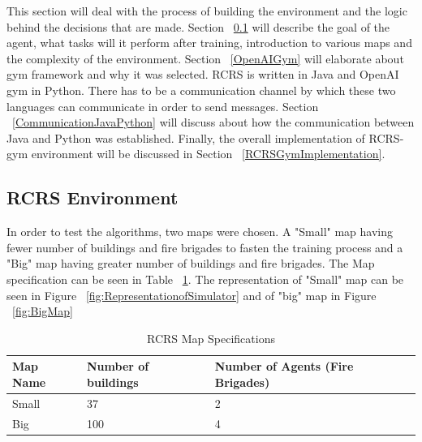 \documentclass[12pt]{report}
\begin{document}
This section will deal with the process of building the environment and the logic behind the decisions that are made. Section ~\ref{RCRSEnvironment} will describe the goal of the agent, what tasks will it perform after training, introduction to various maps and the complexity of the environment. Section ~\ref{OpenAIGym} will elaborate about gym framework and why it was selected. RCRS is written in Java and OpenAI gym in Python. There has to be a communication channel by which these two languages can communicate in order to send messages. Section ~\ref{CommunicationJavaPython} will discuss about how the communication between Java and Python was established. Finally, the overall implementation of RCRS-gym environment will be discussed in Section ~\ref{RCRSGymImplementation}. 


\subsection{RCRS Environment} \label{RCRSEnvironment}


In order to test the algorithms, two maps were chosen. A "Small" map having fewer number of buildings and fire brigades to fasten the training process and a "Big" map having greater number of buildings and fire brigades. The Map specification can be seen in Table ~\ref{table:RCRSMapSpecs}. The representation of "Small" map can be seen in Figure ~\ref{fig:RepresentationofSimulator} and of "big" map in Figure ~\ref{fig:BigMap}

\begin{table} [!h]
\begin{center}
 \begin{tabular}{l | l | l} 
 \hline
 Map Name & Number of buildings & Number of Agents (Fire Brigades)  \\ [0.5ex] 
 \hline\hline
 Small & 37 & 2\\
 Big & 100 & 4\\
 \hline
\end{tabular}
\caption{RCRS Map Specifications}
\label{table:RCRSMapSpecs}
\end{center}
\end{table}
\end{document}

